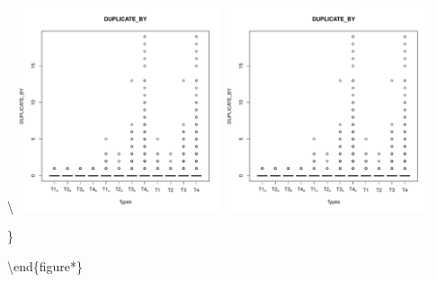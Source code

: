 \textbackslash{}
\includegraphics[page=5, width=0.45\textwidth]{extract/Rplots}
\includegraphics[page=6, width=0.45\textwidth]{extract/Rplots}

\label{fig:boxplots}\}

\textbackslash{}end\{figure*\}

